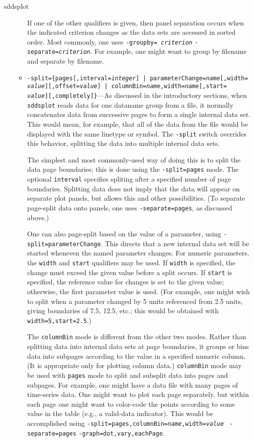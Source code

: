 \begin{sddsprog}{sddsplot}
\begin{itemize}
\begin{itemize}
If one of the other qualifiers is given, then panel separation occurs when the indicated criterion
changes as the data sets are accessed in sorted order.  Most commonly, one uses {\tt -groupby={\em
criterion}} {\tt -separate={\em criterion}}.  For example, one might want to group by filename and
separate by filename.
 
  \item {\tt -split=\{pages[,interval={\em integer}] | parameterChange={\em name}[,width={\em
value}][,offset={\em value}] | columnBin={\em name},width={\em name}[,start={\em
value}][,completely]\}}---As discussed in the introductory sections, when \verb|sddsplot| reads data
for one dataname group from a file, it normally concatenates data from successive pages to form a
single internal data set.  This would mean, for example, that all of the data from the file would be
displayed with the same linetype or symbol.  The {\tt -split} switch overrides this behavior,
splitting the data into multiple internal data sets.

The simplest and most commonly-used way of doing this is to split the data page boundaries; this is
done using the {\tt -split=pages} mode.  The optional {\tt interval} specifies spliting after a
specified number of page boundaries.  Splitting data does not imply that the data will appear on
separate plot panels, but allows this and other possibilities.  (To separate page-split data onto
panels, one uses {\tt -separate=pages}, as discussed above.)

One can also page-split based on the value of a parameter, using {\tt -split=parameterChange}.  This
directs that a new internal data set will be started wheneven the named parameter changes.  For
numeric parameters, the {\tt width} and {\tt start} qualifiers may be used.  If {\tt width} is
specified, the change must exceed the given value before a split occurs.  If {\tt start} is
specified, the reference value for changes is set to the given value; otherwise, the first parameter
value is used.  (For example, one might wish to split when a parameter changed by 5 units referenced
from 2.5 units, giving boundaries of 7.5, 12.5, etc.; this would be obtained with {\tt
width=5,start=2.5}.)

The {\tt columnBin} mode is different from the other two modes.  Rather than splitting data into internal
data sets at page boundaries, it groups or bins data into subpages according to the value in a specified
numeric column.  (It is appropriate only for plotting column data.)  {\tt columnBin} mode may be used with
{\tt pages} mode to split and subsplit data into pages and subpages.  For example, one might have a data
file with many pages of time-series data.  One might want to plot each page separately, but within
each page one might want to color-code the points according to some value in the table (e.g., a valid-data
indicator). This would be accomplished using {\tt -split=pages,columnBin={\em name},width={\em value}} {\tt
-separate=pages} {\tt -graph=dot,vary,eachPage}.


\end{itemize}
\end{itemize}
\end{sddsprog}
